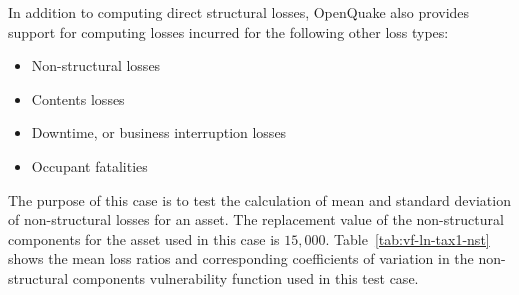In addition to computing direct structural losses, OpenQuake also provides support for computing losses incurred for the following other loss types:

\begin{itemize}
\item{Non-structural losses}
\item{Contents losses}
\item{Downtime, or business interruption losses}
\item{Occupant fatalities}
\end{itemize}






The purpose of this case is to test the calculation of mean and standard deviation of non-structural losses for an asset. The replacement value of the non-structural components for the asset used in this case is $15,000$. Table~\ref{tab:vf-ln-tax1-nst} shows the mean loss ratios and corresponding coefficients of variation in the non-structural components vulnerability function used in this test case.